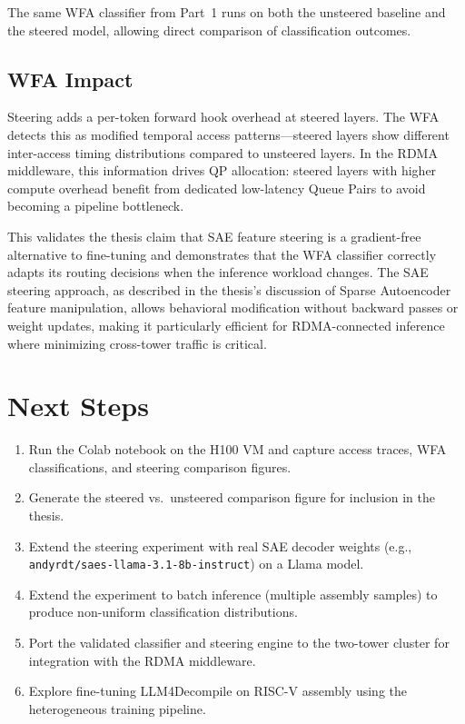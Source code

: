 \documentclass[11pt,letterpaper]{article}
\begin{document}
The same WFA classifier from Part~1 runs on both the unsteered baseline and the steered model, allowing direct comparison of classification outcomes.

\subsection{WFA Impact}

Steering adds a per-token forward hook overhead at steered layers. The WFA detects this as modified temporal access patterns---steered layers show different inter-access timing distributions compared to unsteered layers. In the RDMA middleware, this information drives QP allocation: steered layers with higher compute overhead benefit from dedicated low-latency Queue Pairs to avoid becoming a pipeline bottleneck.

This validates the thesis claim that SAE feature steering is a gradient-free alternative to fine-tuning and demonstrates that the WFA classifier correctly adapts its routing decisions when the inference workload changes. The SAE steering approach, as described in the thesis's discussion of Sparse Autoencoder feature manipulation, allows behavioral modification without backward passes or weight updates, making it particularly efficient for RDMA-connected inference where minimizing cross-tower traffic is critical.

\section{Next Steps}
\label{sec:next-steps}

\begin{enumerate}
    \item Run the Colab notebook on the H100 VM and capture access traces, WFA classifications, and steering comparison figures.
    \item Generate the steered vs.\ unsteered comparison figure for inclusion in the thesis.
    \item Extend the steering experiment with real SAE decoder weights (e.g., \texttt{andyrdt/saes-llama-3.1-8b-instruct}) on a Llama model.
    \item Extend the experiment to batch inference (multiple assembly samples) to produce non-uniform classification distributions.
    \item Port the validated classifier and steering engine to the two-tower cluster for integration with the RDMA middleware.
    \item Explore fine-tuning LLM4Decompile on RISC-V assembly using the heterogeneous training pipeline.
\end{enumerate}
\end{document}
